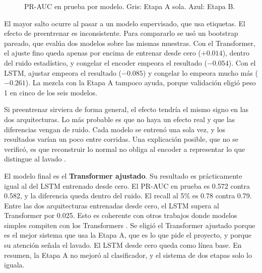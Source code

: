 \documentclass[11pt]{article}
\begin{document}
\begin{figure}[ht]
\centering
{}
\caption{PR-AUC en prueba por modelo. Gris: Etapa A sola. Azul: Etapa B.}
\end{figure}

El mayor salto ocurre al pasar a un modelo supervisado, que usa etiquetas. El efecto de preentrenar es inconsistente. Para compararlo se usó un bootstrap pareado, que evalúa dos modelos sobre las mismas muestras. Con el Transformer, el ajuste fino queda apenas por encima de entrenar desde cero ($+0.014$), dentro del ruido estadístico, y congelar el encoder empeora el resultado ($-0.054$). Con el LSTM, ajustar empeora el resultado ($-0.085$) y congelar lo empeora mucho más ($-0.261$). La mezcla con la Etapa A tampoco ayuda, porque validación eligió peso 1 en cinco de los seis modelos.

Si preentrenar sirviera de forma general, el efecto tendría el mismo signo en las dos arquitecturas. Lo más probable es que no haya un efecto real y que las diferencias vengan de ruido. Cada modelo se entrenó una sola vez, y los resultados varían un poco entre corridas. Una explicación posible, que no se verificó, es que reconstruir lo normal no obliga al encoder a representar lo que distingue al lavado \cite{gururangan2020}.

El modelo final es el \textbf{Transformer ajustado}. Su resultado es prácticamente igual al del LSTM entrenado desde cero. El PR-AUC en prueba es 0.572 contra 0.582, y la diferencia queda dentro del ruido. El recall al 5\% es 0.78 contra 0.79. Entre las dos arquitecturas entrenadas desde cero, el LSTM supera al Transformer por 0.025. Esto es coherente con otros trabajos donde modelos simples compiten con los Transformers \cite{zeng2023}. Se eligió el Transformer ajustado porque es el mejor sistema que usa la Etapa A, que es lo que pide el proyecto, y porque su atención señala el lavado. El LSTM desde cero queda como línea base. En resumen, la Etapa A no mejoró al clasificador, y el sistema de dos etapas solo lo iguala.
\end{document}
